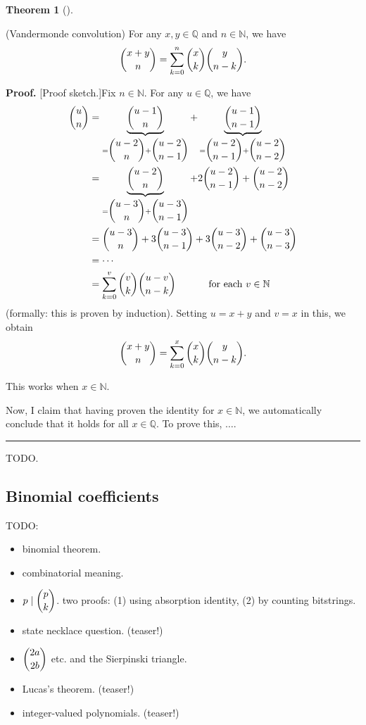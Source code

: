 \documentclass[numbers=enddot,12pt,final,onecolumn,notitlepage]{scrartcl}%
\numberwithin{exer}{subsection}
\theoremstyle{definition}
\newtheorem{theo}{Theorem}[subsection]
\newenvironment{theorem}[1][]
{\begin{theo}[#1]\begin{leftbar}}
{\end{leftbar}\end{theo}}
\newenvironment{proof}[1][Proof]{\noindent\textbf{#1.} }{\ \rule{0.5em}{0.5em}}
\let\sumnonlimits\sum
\renewcommand{\sum}{\sumnonlimits\limits}
\begin{document}
\begin{theorem}
(Vandermonde convolution) For any $x,y\in\mathbb{Q}$ and $n\in\mathbb{N}$, we
have%
\[
\dbinom{x+y}{n}=\sum_{k=0}^{n}\dbinom{x}{k}\dbinom{y}{n-k}.
\]

\end{theorem}

\begin{proof}
[Proof sketch.]Fix $n\in\mathbb{N}$. For any $u\in\mathbb{Q}$, we have%
\begin{align*}
\dbinom{u}{n}  &  =\underbrace{\dbinom{u-1}{n}}_{=\dbinom{u-2}{n}+\dbinom
{u-2}{n-1}}+\underbrace{\dbinom{u-1}{n-1}}_{=\dbinom{u-2}{n-1}+\dbinom
{u-2}{n-2}}\\
&  =\underbrace{\dbinom{u-2}{n}}_{=\dbinom{u-3}{n}+\dbinom{u-3}{n-1}}%
+2\dbinom{u-2}{n-1}+\dbinom{u-2}{n-2}\\
&  =\dbinom{u-3}{n}+3\dbinom{u-3}{n-1}+3\dbinom{u-3}{n-2}+\dbinom{u-3}{n-3}\\
&  =\cdots\\
&  =\sum_{k=0}^{v}\dbinom{v}{k}\dbinom{u-v}{n-k}\ \ \ \ \ \ \ \ \ \ \text{for
each }v\in\mathbb{N}%
\end{align*}
(formally: this is proven by induction). Setting $u=x+y$ and $v=x$ in this, we
obtain%
\[
\dbinom{x+y}{n}=\sum_{k=0}^{x}\dbinom{x}{k}\dbinom{y}{n-k}.
\]


This works when $x\in\mathbb{N}$.

Now, I claim that having proven the identity for $x\in\mathbb{N}$, we
automatically conclude that it holds for all $x\in\mathbb{Q}$. To prove this,
$\ldots$.
\end{proof}

TODO.

\subsection{Binomial coefficients}

TODO:

\begin{itemize}
\item binomial theorem.

\item combinatorial meaning.

\item $p\mid\dbinom{p}{k}$. two proofs: (1) using absorption identity, (2) by
counting bitstrings.

\item state necklace question. (teaser!)

\item $\dbinom{2a}{2b}$ etc. and the Sierpinski triangle.

\item Lucas's theorem. (teaser!)

\item integer-valued polynomials. (teaser!)
\end{itemize}
\end{document}
